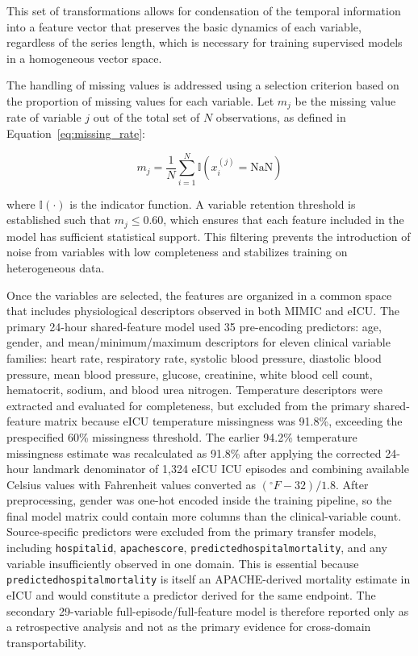 \documentclass[utf8]{FrontiersinHarvard} %
\begin{document}
This set of transformations allows for condensation of the temporal information into a feature vector that preserves the basic dynamics of each variable, regardless of the series length, which is necessary for training supervised models in a homogeneous vector space.

The handling of missing values is addressed using a selection criterion based on the proportion of missing values for each variable. Let $m_j$ be the missing value rate of variable $j$ out of the total set of $N$ observations, as defined in Equation~\ref{eq:missing_rate}:

\begin{equation}
	m_j = \frac{1}{N} \sum_{i=1}^{N} \mathbb{I}\left(x_i^{(j)} = \text{NaN}\right)
	\label{eq:missing_rate}
\end{equation}

where $\mathbb{I}(\cdot)$ is the indicator function. A variable retention threshold is established such that $m_j \leq 0.60$, which ensures that each feature included in the model has sufficient statistical support. This filtering prevents the introduction of noise from variables with low completeness and stabilizes training on heterogeneous data.

Once the variables are selected, the features are organized in a common space that includes physiological descriptors observed in both MIMIC and eICU. The primary 24-hour shared-feature model used 35 pre-encoding predictors: age, gender, and mean/minimum/maximum descriptors for eleven clinical variable families: heart rate, respiratory rate, systolic blood pressure, diastolic blood pressure, mean blood pressure, glucose, creatinine, white blood cell count, hematocrit, sodium, and blood urea nitrogen. Temperature descriptors were extracted and evaluated for completeness, but excluded from the primary shared-feature matrix because eICU temperature missingness was 91.8\%, exceeding the prespecified 60\% missingness threshold. The earlier 94.2\% temperature missingness estimate was recalculated as 91.8\% after applying the corrected 24-hour landmark denominator of 1,324 eICU ICU episodes and combining available Celsius values with Fahrenheit values converted as $(^{\circ}F-32)/1.8$. After preprocessing, gender was one-hot encoded inside the training pipeline, so the final model matrix could contain more columns than the clinical-variable count. Source-specific predictors were excluded from the primary transfer models, including \texttt{hospitalid}, \texttt{apachescore}, \texttt{predictedhospitalmortality}, and any variable insufficiently observed in one domain. This is essential because \texttt{predictedhospitalmortality} is itself an APACHE-derived mortality estimate in eICU and would constitute a predictor derived for the same endpoint. The secondary 29-variable full-episode/full-feature model is therefore reported only as a retrospective analysis and not as the primary evidence for cross-domain transportability.
\end{document}
